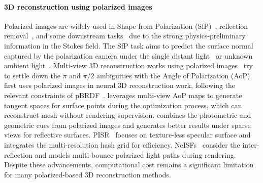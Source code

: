 \paragraph{3D reconstruction using polarized images}
Polarized images are widely used in Shape from Polarization (SfP)~\cite{miyazaki2003polarization, baek2018simultaneous, smith2018height, deschaintre2021deep, lei2022shape, ba2020deep, lyu2023shape,li2024deep, yang2024gnerp, lyu2024sfpuel}, reflection removal~\cite{li2020reflection,lyu2022physics,wang2025polarized}, and some downstream tasks~\cite{zhou2023polarization, li2023polarized} due to the strong physics-preliminary information in the Stokes field. The SfP task aims to predict the surface normal captured by the polarization camera under the single distant light~\cite{lyu2023shape, smith2018height} or unknown ambient light~\cite{ba2020deep,lei2022shape}. Multi-view 3D reconstruction works using polarized images~\cite{zhao2022polarimetric} try to settle down the $\pi$ and $\pi/2$ ambiguities with the Angle of Polarization (AoP). \pandora first uses polarized images in neural 3D reconstruction work, following the relevant constraints of pBRDF~\cite{baek2018simultaneous}. \mvas leverages multi-view AoP maps to generate tangent spaces for surface points during the optimization process, which can 
reconstruct mesh without rendering supervision. \nersp combines the photometric and geometric cues from polarized images and generates better results under sparse views for reflective surfaces. PISR~\cite{chen2024pisr} focuses on texture-less specular surface 
and integrates the multi-resolution hash grid for efficiency.
NeISFs~\cite{li2024neisf,li2025neisf++} consider the inter-reflection and models multi-bounce polarized light paths during rendering. Despite these advancements, computational cost remains a significant limitation for many polarized-based 3D reconstruction methods.


